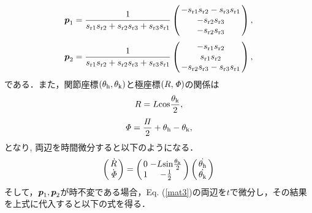\begin{eqnarray}
 \arraycolsep=1.5pt
 \ve{p}_1=\frac{1}{s_{{\rm r}1}s_{{\rm r}2}+s_{{\rm r}2}s_{{\rm r}3}+s_{{\rm r}3}s_{{\rm r}1}}
 \left(
  \begin{array}{c}
   -s_{{\rm r}1}s_{{\rm r}2}-s_{{\rm r}3}s_{{\rm r}1} \\
   -s_{{\rm r}2}s_{{\rm r}3} \\
   -s_{{\rm r}2}s_{{\rm r}3}
  \end{array}
 \right),
 \label{s1}
\end{eqnarray}
\begin{eqnarray}
 \arraycolsep=1.5pt
 \ve{p}_2=\frac{1}{s_{{\rm r}1}s_{{\rm r}2}+s_{{\rm r}2}s_{{\rm r}3}+s_{{\rm r}3}s_{{\rm r}1}}
 \left(
  \begin{array}{c}
   -s_{{\rm r}1}s_{{\rm r}2} \\
   s_{{\rm r}1}s_{{\rm r}2} \\
   -s_{{\rm r}2}s_{{\rm r}3}-s_{{\rm r}3}s_{{\rm r}1}
  \end{array}
 \right),
 \label{s2}
\end{eqnarray}
である．また，関節座標$(\theta_{\rm h},\theta_{\rm k})$と極座標$(R,{\it \Phi})$の関係は
\begin{eqnarray}
 R=L{\rm cos}\frac{\theta_{\rm k}}{2},
\end{eqnarray}
\begin{eqnarray}
 {\it \Phi}=\frac{\it \Pi}{2}+{\theta_{\rm h}}-{\theta_{\rm k}},
\end{eqnarray}
となり, 両辺を時間微分すると以下のようになる．
\begin{eqnarray}
 \label{jacobi}
 \arraycolsep=1.5pt
 \left(
  \begin{array}{c}
   \dot{R} \\
   \dot{{\it \Phi}}
  \end{array}
 \right)
 =
 \left(
  \begin{array}{cc}
   0 & -L{\rm sin}\frac{\theta_{\rm k}}{2} \\
   1 & -\frac{1}{2}
  \end{array}
 \right)
 \left(
  \begin{array}{c}
   \dot{\theta_{\rm h}} \\
   \dot{\theta_{\rm k}}
  \end{array}
 \right)
\end{eqnarray}
そして，$\mbox{\boldmath{$p$}}_1,\mbox{\boldmath{$p$}}_2$が時不変である場合，Eq. (\ref{mat3})の両辺を$t$で微分し，その結果を上式に代入すると以下の式を得る．
